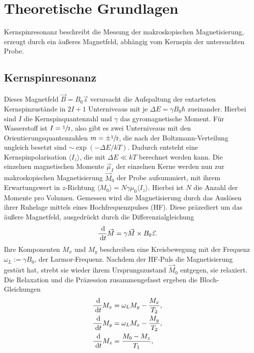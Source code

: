 \newpage					%



\section{Theoretische Grundlagen}
\setcounter{page}{1}
Kernspinresonanz beschreibt die Messung der makroskopischen Magnetisierung, erzeugt durch ein äußeres Magnetfeld, abhängig vom Kernspin der
untersuchten Probe.
\subsection{Kernspinresonanz}
Dieses Magnetfeld $\vec B=B_0\vec z$ verursacht die Aufspaltung der entarteten Kernspinzustände in $2I+1$ Unterniveaus mit je 
$\Delta E = \gamma B_0 \hbar$ zueinander. Hierbei sind $I$ die Kernspinquantenzahl und $\gamma$ das gyromagnetische Moment. Für Wasserstoff ist
$I=\sfrac12$, also gibt es zwei Unterniveaus mit den Orientierungsquantenzahlen $m=\pm\sfrac12$, die nach der Boltzmann-Verteilung ungleich besetzt 
sind $\sim\exp\left(-\Delta E/kT\right)$.
Dadurch entsteht eine Kernspinpolarisation $\langle I_z \rangle$, die mit $\Delta E \ll kT$ berechnet werden kann. 
Die einzelnen magnetischen Momente $\vec \mu_I$ der einzelnen Kerne werden nun zur makroskopischen Magnetisierung $\vec M_0$ der Probe aufsummiert,
mit ihrem Erwartungswert in $z$-Richtung $\langle M_0\rangle = N \gamma \mu_0 \langle I_z\rangle$. Hierbei ist $N$ die Anzahl der Momente pro Volumen.
Gemessen wird die Magnetisierung durch das Auslösen ihrer Ruhelage mittels eines Hochfrequenzpulses (HF). Diese präzediert um das äußere Magnetfeld,
ausgedrückt durch die Differenzialgleichung
\begin{align}
 \frac{\; \mathrm{d}}{\; \mathrm{d} t}\vec M = \gamma \vec M \times B_0 \vec z.
 \label{eq:Mdgl}
\end{align}
Ihre Komponenten $M_x$ und $M_y$ beschreiben eine Kreisbewegung mit der Frequenz $\omega_L := \gamma B_0$, der Larmor-Frequenz. Nachdem
der HF-Puls die Magnetisierung gestört hat, strebt sie wieder ihrem Ursprungszustand $\vec M_0$ entgegen, sie relaxiert. Die Relaxation
und die Präzession zusammengefasst ergeben die Bloch-Gleichungen
\begin{align}
 \frac{\; \mathrm{d}}{\; \mathrm{d} t}M_x &= \omega_L M_y - \frac{M_x}{T_2},\\
 \frac{\; \mathrm{d}}{\; \mathrm{d} t}M_y &= \omega_L M_x - \frac{M_y}{T_2},\\
 \frac{\; \mathrm{d}}{\; \mathrm{d} t}M_z &= \frac{M_0-M_z}{T_1},
 \label{eq:bloch}
\end{align}
